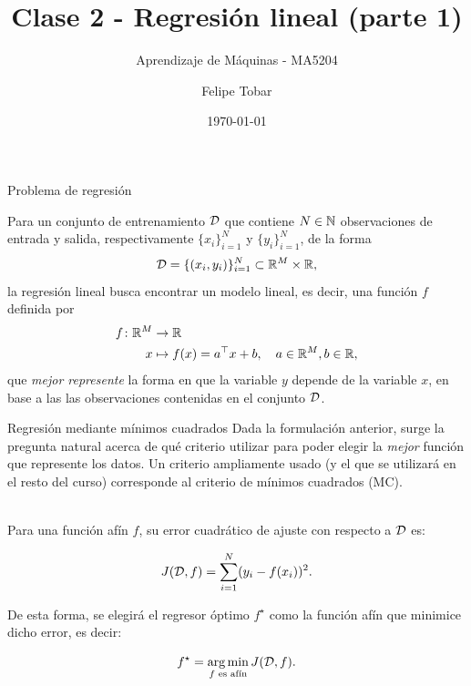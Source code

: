 \documentclass[handout, 9pt]{beamer}
\title{Clase 2 - Regresión lineal (parte 1)}
\subtitle{Aprendizaje de Máquinas - MA5204}
\date{\today}
\author{Felipe Tobar}
\institute{Department of Mathematical Engineering \&\\ Center for Mathematical Modelling\\Universidad de Chile}
\begin{document}
\begin{frame}
  \titlepage
\end{frame}


\begin{frame}{Problema de regresión}
	
Para un conjunto de entrenamiento ${\mathcal D}$ que contiene $N\in{\mathbb N}$ observaciones de entrada y salida, respectivamente $\{x_i\}_{i=1}^N$ y $\{y_i\}_{i=1}^N$, de la forma
\begin{equation*}
	{\mathcal D}=\{(x_i,y_i)\}_{i=1}^N\subset \mathbb{R}^M \times \mathbb{R},
	\label{eq:training_set}
\end{equation*}\pause
la regresión lineal busca encontrar un modelo lineal, es decir, una función $f$ definida por 
\begin{align*}
  f \colon \mathbb{R}^M &\to \mathbb{R}\nonumber\\
  x &\mapsto f(x)=a^\top x + b,\quad a\in\mathbb{R}^M,b\in\mathbb{R},
\end{align*}
que \emph{mejor represente} la forma en que la variable $y$ depende de la variable $x$, en base a las las observaciones contenidas en el conjunto ${\mathcal D}$.

\end{frame}

\begin{frame}{Regresión mediante mínimos cuadrados}
Dada la formulación anterior, surge la pregunta natural acerca de qué criterio utilizar para poder elegir la \emph{mejor} función que represente los datos. Un criterio ampliamente usado (y el que se utilizará en el resto del curso) corresponde al criterio de mínimos cuadrados (MC).\\~\ \pause

Para una función afín $f$, su error cuadrático de ajuste con respecto a ${\mathcal D}$ es:

\begin{equation*}
	J({\mathcal D},f) = \sum_{i=1}^N(y_i-f(x_i))^2.
	\label{eq:least_squares_cost}
\end{equation*}\pause

De esta forma, se elegirá el regresor óptimo $f^\star$ como la función afín que minimice dicho error, es decir:

\begin{equation*}
	f^\star = \operatorname*{arg\,min}_{f\text{ es afín}} J({\mathcal D},f).
\end{equation*}

\end{frame}
\end{document}
